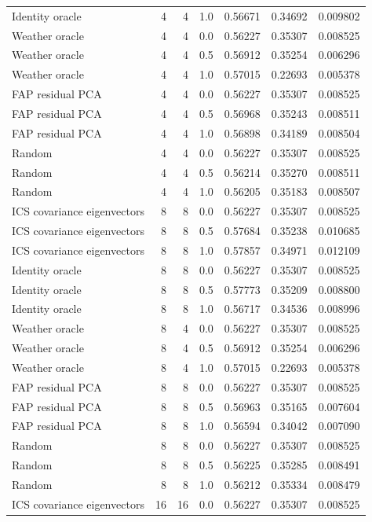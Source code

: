 \begin{tabular}{lrrrrrr}
Identity oracle & 4 & 4 & 1.0 & 0.56671 & 0.34692 & 0.009802 \\
Weather oracle & 4 & 4 & 0.0 & 0.56227 & 0.35307 & 0.008525 \\
Weather oracle & 4 & 4 & 0.5 & 0.56912 & 0.35254 & 0.006296 \\
Weather oracle & 4 & 4 & 1.0 & 0.57015 & 0.22693 & 0.005378 \\
FAP residual PCA & 4 & 4 & 0.0 & 0.56227 & 0.35307 & 0.008525 \\
FAP residual PCA & 4 & 4 & 0.5 & 0.56968 & 0.35243 & 0.008511 \\
FAP residual PCA & 4 & 4 & 1.0 & 0.56898 & 0.34189 & 0.008504 \\
Random & 4 & 4 & 0.0 & 0.56227 & 0.35307 & 0.008525 \\
Random & 4 & 4 & 0.5 & 0.56214 & 0.35270 & 0.008511 \\
Random & 4 & 4 & 1.0 & 0.56205 & 0.35183 & 0.008507 \\
ICS covariance eigenvectors & 8 & 8 & 0.0 & 0.56227 & 0.35307 & 0.008525 \\
ICS covariance eigenvectors & 8 & 8 & 0.5 & 0.57684 & 0.35238 & 0.010685 \\
ICS covariance eigenvectors & 8 & 8 & 1.0 & 0.57857 & 0.34971 & 0.012109 \\
Identity oracle & 8 & 8 & 0.0 & 0.56227 & 0.35307 & 0.008525 \\
Identity oracle & 8 & 8 & 0.5 & 0.57773 & 0.35209 & 0.008800 \\
Identity oracle & 8 & 8 & 1.0 & 0.56717 & 0.34536 & 0.008996 \\
Weather oracle & 8 & 4 & 0.0 & 0.56227 & 0.35307 & 0.008525 \\
Weather oracle & 8 & 4 & 0.5 & 0.56912 & 0.35254 & 0.006296 \\
Weather oracle & 8 & 4 & 1.0 & 0.57015 & 0.22693 & 0.005378 \\
FAP residual PCA & 8 & 8 & 0.0 & 0.56227 & 0.35307 & 0.008525 \\
FAP residual PCA & 8 & 8 & 0.5 & 0.56963 & 0.35165 & 0.007604 \\
FAP residual PCA & 8 & 8 & 1.0 & 0.56594 & 0.34042 & 0.007090 \\
Random & 8 & 8 & 0.0 & 0.56227 & 0.35307 & 0.008525 \\
Random & 8 & 8 & 0.5 & 0.56225 & 0.35285 & 0.008491 \\
Random & 8 & 8 & 1.0 & 0.56212 & 0.35334 & 0.008479 \\
ICS covariance eigenvectors & 16 & 16 & 0.0 & 0.56227 & 0.35307 & 0.008525 \\

\end{tabular}
